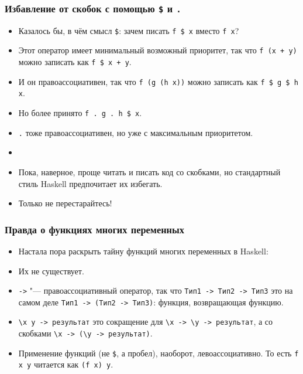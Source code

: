 \documentclass[10pt]{beamer}
\begin{document}
\begin{frame}[fragile]
  \frametitle{Избавление от скобок с помощью \lstinline|$| и \lstinline|.|}
  \begin{itemize}
    \item Казалось бы, в чём смысл \lstinline|$|: зачем писать \lstinline|f $ x| вместо \lstinline|f x|?\pause
    \item Этот оператор имеет минимальный возможный приоритет, так что \lstinline|f (x + y)| можно записать как \lstinline|f $ x + y|.\pause
    \item И он правоассоциативен, так что \lstinline|f (g (h x))| можно записать как \lstinline|f $ g $ h x|.\pause
    \item Но более принято \lstinline|f . g . h $ x|.\pause
    \item \lstinline|.| тоже правоассоциативен, но уже с максимальным приоритетом.\pause
    \item[]
    \item Пока, наверное, проще читать и писать код со скобками, но стандартный стиль Haskell предпочитает их избегать.
    \item Только не перестарайтесь!
  \end{itemize}
\end{frame}

\begin{frame}[fragile]
  \frametitle{Правда о функциях многих переменных}
  \begin{itemize}
    \item Настала пора раскрыть тайну функций многих переменных в Haskell:\pause
    \item Их не существует.\pause
    \item \lstinline|->| "--- правоассоциативный оператор, так что \lstinline|Тип1 -> Тип2 -> Тип3| это на самом деле \lstinline|Тип1 -> (Тип2 -> Тип3)|: функция, возвращающая функцию.\pause
    \item \lstinline|\x y -> результат| это сокращение для \lstinline|\x -> \y -> результат|, а со скобками \lstinline|\x -> (\y -> результат)|.\pause
    \item Применение функций (не \lstinline|$|, а пробел), наоборот, левоассоциативно. То есть \lstinline|f x y| читается как \lstinline|(f x) y|.
  \end{itemize}
\end{frame}
\end{document}
